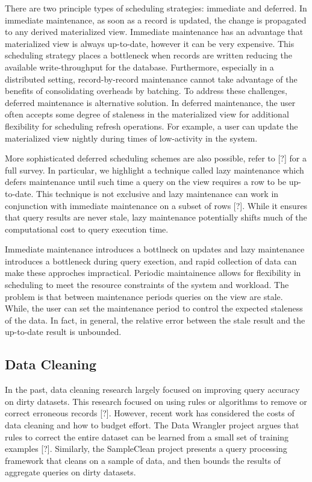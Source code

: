 There are two principle types of scheduling strategies: immediate and deferred. 
In immediate maintenance, as soon as a record is updated, 
the change is propagated to any derived materialized view.
Immediate maintenance has an advantage that materialized view is always up-to-date, 
however it can be very expensive.
This scheduling strategy places a bottleneck when records are written reducing 
the available write-throughput for the database.
Furthermore, especially in a distributed setting, record-by-record 
maintenance cannot take advantage of the benefits of consolidating overheads by batching.
To address these challenges, deferred maintenance is alternative solution.
In deferred maintenance, the user often accepts some degree of staleness in 
the materialized view for additional flexibility for scheduling refresh operations.
For example, a user can update the materialized view 
nightly during times of low-activity in the system.

More sophisticated deferred scheduling schemes are also possible, refer to [?] for a full survey.
In particular, we highlight a technique called lazy maintenance which defers maintenance until such time
a query on the view requires a row to be up-to-date.
This technique is not exclusive and lazy maintenance can work in conjunction with immediate maintenance on a subset of rows [?].
While it ensures that query results are never stale, lazy maintenance potentially shifts much of the computational cost
to query execution time.

Immediate maintenance introduces a bottlneck on updates and lazy maintenance introduces a bottleneck during query exection,
and rapid collection of data can make these approches impractical.
Periodic maintainence allows for flexibility in scheduling to meet the resource constraints of the system and workload.
The problem is that between maintenance periods queries on the view are stale.
While, the user can set the maintenance period to control the expected staleness of the data.
In fact, in general, the relative error between the stale result and the up-to-date result is unbounded.

\subsection{Data Cleaning}
In the past, data cleaning research largely focused on improving query accuracy on dirty datasets.
This research focused on using rules or algorithms to remove or correct erroneous records [?].
However, recent work has considered the costs of data cleaning and how to budget effort.
The Data Wrangler project argues that rules to correct the entire dataset can be learned from a small set of training examples [?].
Similarly, the SampleClean project presents a query processing framework that cleans on a sample of data, and then bounds the results of aggregate queries on dirty datasets.

